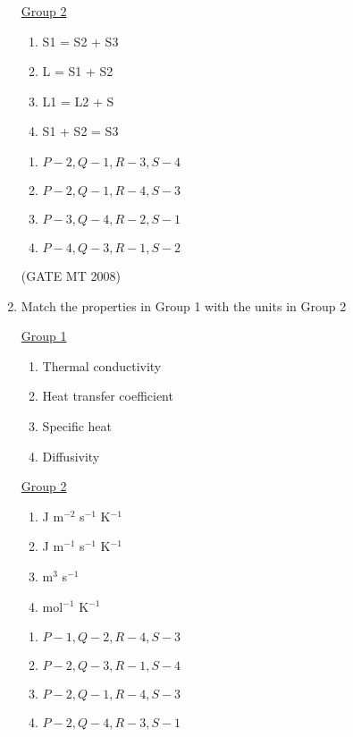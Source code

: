 \documentclass[11pt, letterpaper]{article}
\theoremstyle{remark}
\begin{document}
\begin{enumerate}
\begin{multicols}{2}
\underline{Group 2}
\begin{enumerate}[label=(\arabic*), start=1]
\item S1 = S2 + S3
\item L = S1 + S2
\item L1 = L2 + S
\item S1 + S2 = S3
\end{enumerate}
\end{multicols}

\begin{multicols}{2}
\begin{enumerate} 
\item $P-2, Q-1, R-3, S-4$
\item $P-2, Q-1, R-4, S-3$
\item $P-3, Q-4, R-2, S-1$
\item $P-4, Q-3, R-1, S-2$
\end{enumerate}
\end{multicols}

\hfill(GATE MT 2008)

\item Match the properties in Group 1 with the units in Group 2
\begin{multicols}{2}
\underline{Group 1}
\begin{enumerate}[label=(\Alph*), start=16]
\item Thermal conductivity
\item Heat transfer coefficient 
\item Specific heat
\item Diffusivity 
\end{enumerate}

\underline{Group 2}
\begin{enumerate}[label=(\arabic*), start=1]
\item J m$^{-2}$ s$^{-1}$ K$^{-1}$
\item J m$^{-1}$ s$^{-1}$ K$^{-1}$ 
\item m$^3$ s$^{-1}$
\item mol$^{-1}$ K$^{-1}$
\end{enumerate}
\end{multicols}

\begin{multicols}{2}
\begin{enumerate} 
\item $P-1, Q-2, R-4, S-3$
\item $P-2, Q-3, R-1, S-4$
\item $P-2, Q-1, R-4, S-3$
\item $P-2, Q-4, R-3, S-1$
\end{enumerate}
\end{multicols}


\end{enumerate}
\end{document}
